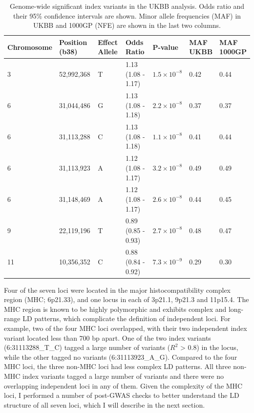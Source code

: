   \begin{table}[htb]
    \centering\begingroup\fontsize{10}{14}\selectfont
    \caption[pAD-associated variants from the UKBB GWAS]{Genome-wide significant index variants in the UKBB analysis. Odds ratio and their 95\% confidence intervals are shown. Minor allele frequencies (MAF) in UKBB and 1000GP (NFE) are shown in the last two columns.}
    \label{table:gws}
    \begin{tabular}[t]{|l|l|l|l|l|l|l|}
      \hline
      Chromosome & Position (b38) & Effect Allele & Odds Ratio & P-value & \makecell{MAF\\ UKBB} & \makecell{MAF\\ 1000GP}\\
      \hline
      3 & 52,992,368 & T & 1.13 (1.08 - 1.17) & $1.5\times10^{-8}$ & 0.42 & 0.44\\
      \hline
      6 & 31,044,486 & G & 1.13 (1.08 - 1.18) & $2.2\times10^{-8}$ & 0.37 & 0.37\\
      \hline
      6 & 31,113,288 & C & 1.13 (1.08 - 1.18) & $1.1\times10^{-8}$ & 0.41 & 0.44\\
      \hline
      6 & 31,113,923 & A & 1.12 (1.08 - 1.17) & $3.2\times10^{-8}$ & 0.49 & 0.49\\
      \hline
      6 & 31,148,469 & A & 1.12 (1.08 - 1.17) & $2.6\times10^{-8}$ & 0.44 & 0.45\\
      \hline
      9 & 22,119,196 & T & 0.89 (0.85 - 0.93) & $2.7\times10^{-8}$ & 0.48 & 0.47\\
      \hline
      11 & 10,356,352 & C & 0.88 (0.84 - 0.92) & $7.3\times10^{-9}$ & 0.29 & 0.30\\
      \hline
      \end{tabular}

    \endgroup{}

    \end{table}

    Four of the seven loci were located in the major histocompatibility complex region (MHC; 6p21.33), and one locus in each of 3p21.1, 9p21.3 and 11p15.4. The MHC region is known to be highly polymorphic and exhibits complex and long-range LD patterns, which complicate the definition of independent loci. 
    For example, two of the four MHC loci overlapped, with their two independent index variant located less than 700 bp apart. One of the two index variants (6:31113288\_T\_C) tagged a large number of variants ($R^{2}$ > 0.8) in the locus, while the other tagged no variants (6:31113923\_A\_G). Compared to the four MHC loci, the three non-MHC loci had less complex LD patterns. All three non-MHC index variants tagged a large number of variants and there were no overlapping independent loci in any of them. Given the complexity of the MHC loci, I performed a number of post-GWAS checks to better understand the LD structure of all seven loci, which I will describe in the next section.


